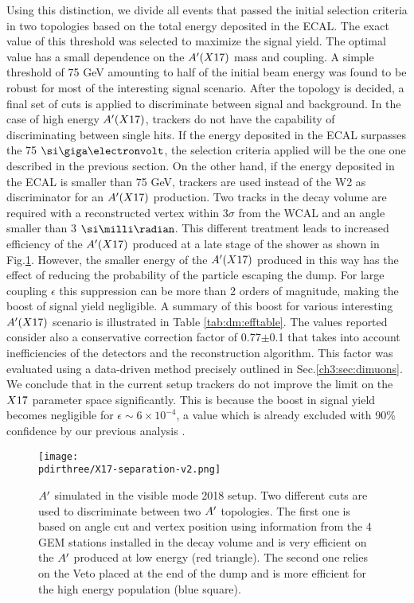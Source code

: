 Using this distinction, we divide all events that passed the initial selection criteria in two topologies based on the total energy deposited in the ECAL. The exact value of this threshold was selected to maximize the signal yield. The optimal value has a small dependence on the $A'(X17)$ mass and coupling. A simple threshold of 75 GeV amounting to half of the initial beam energy was found to be robust for most of the interesting signal scenario. After the topology is decided, a final set of cuts is applied to discriminate between signal and background. In the case of high energy $A'(X17)$, trackers do not have the capability of discriminating between single hits. If the energy deposited in the ECAL surpasses the 75 $\gev$, the selection criteria applied will be the one one described in the previous section. On the other hand, if the energy deposited in the ECAL is smaller than 75 GeV, trackers are used instead of the W2 as discriminator for an $A'(X17)$ production. Two tracks in the decay volume are required with a reconstructed vertex within 3$\sigma$ from the WCAL and an angle smaller than 3 $\mrad$. This different treatment leads to increased efficiency of the $A'(X17)$ produced at a late stage of the shower as shown in Fig.\ref{fig:combined-analysis}. However, the smaller energy of the $A'(X17)$ produced in this way has the effect of reducing the probability of the particle escaping the dump. For large coupling $\epsilon$ this suppression can be more than 2 orders of magnitude, making the boost of signal yield negligible. A summary of this boost for various interesting $A'(X17)$ scenario is illustrated in Table \ref{tab:dm:efftable}. The values reported consider also a conservative correction factor of 0.77$\pm$0.1 that takes into account inefficiencies of the detectors and the reconstruction algorithm. This factor was evaluated using a data-driven method precisely outlined in Sec.\ref{ch3:sec:dimuons}. We conclude that in the current setup trackers do not improve the limit on the $X17$ parameter space significantly. This is because the boost in signal yield becomes negligible for $\epsilon \sim 6 \times 10^{-4}$, a value which is already excluded with 90\% confidence by our previous analysis \cite{Banerjee:2019hmi}.

\begin{figure}[tbh!]
  \centering
  \texttt{[image: \\pdirthree/X17-separation-v2.png]}
  \caption[Comparison of selected $\DM$ between the calorimeter and tracking analysis]{$\DM$ simulated in the visible mode 2018 setup. Two different cuts are used to discriminate between two $\DM$ topologies. The first one is based on angle cut and vertex position using information from the 4 GEM stations installed in the decay volume and is very efficient on the $\DM$ produced at low energy (red triangle). The second one relies on the Veto placed at the end of the dump and is more efficient for the high energy population (blue square).}
  \label{fig:combined-analysis}
\end{figure}

